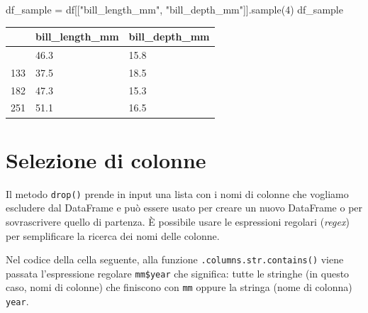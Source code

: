 \documentclass[
  letterpaper,
  krantz2]{{[}./krantz{]}}
\newenvironment{Shaded}{\begin{snugshade}}{\end{snugshade}}
\newcommand{\DecValTok}[1]{\textcolor[rgb]{0.68,0.00,0.00}{#1}}
\newcommand{\NormalTok}[1]{\textcolor[rgb]{0.00,0.23,0.31}{#1}}
\newcommand{\OperatorTok}[1]{\textcolor[rgb]{0.37,0.37,0.37}{#1}}
\newcommand{\StringTok}[1]{\textcolor[rgb]{0.13,0.47,0.30}{#1}}
\begin{document}
\begin{Shaded}
\begin{Highlighting}[]
\NormalTok{df\_sample }\OperatorTok{=}\NormalTok{ df[[}\StringTok{"bill\_length\_mm"}\NormalTok{, }\StringTok{"bill\_depth\_mm"}\NormalTok{]].sample(}\DecValTok{4}\NormalTok{)}
\NormalTok{df\_sample}
\end{Highlighting}
\end{Shaded}

\begin{longtable}[]{@{}lll@{}}
\toprule\noalign{}
& bill\_length\_mm & bill\_depth\_mm \\
\midrule\noalign{}
\endhead
\bottomrule\noalign{}
\endlastfoot
175 & 46.3 & 15.8 \\
133 & 37.5 & 18.5 \\
182 & 47.3 & 15.3 \\
251 & 51.1 & 16.5 \\
\end{longtable}

\section{Selezione di colonne}\label{selezione-di-colonne}

Il metodo \texttt{drop()} prende in input una lista con i nomi di
colonne che vogliamo escludere dal DataFrame e può essere usato per
creare un nuovo DataFrame o per sovrascrivere quello di partenza. È
possibile usare le espressioni regolari (\emph{regex}) per semplificare
la ricerca dei nomi delle colonne.

\begin{Shaded}
\end{Shaded}

Nel codice della cella seguente, alla funzione
\texttt{.columns.str.contains()} viene passata l'espressione regolare
\texttt{mm\$\textbar{}year} che significa: tutte le stringhe (in questo
caso, nomi di colonne) che finiscono con \texttt{mm} oppure la stringa
(nome di colonna) \texttt{year}.
\end{document}
